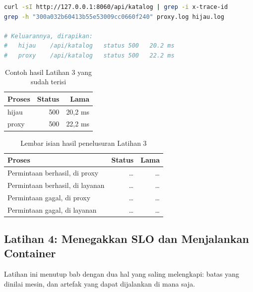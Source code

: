 \begin{lstlisting}[language=bash, caption={Mengambil trace id lalu mencarinya di kedua log, tersedia di \berkas{sources/chapter09/proxy.py}}, label={lst:c9-lat3-jalan}]
curl -sI http://127.0.0.1:8060/api/katalog | grep -i x-trace-id
grep -h "300a032b60413b55e53009cc0660f240" proxy.log hijau.log

# Keluarannya, dirapikan:
#   hijau    /api/katalog   status 500   20.2 ms
#   proxy    /api/katalog   status 500   22.2 ms
\end{lstlisting}

\begin{table}[!htb]
  \centering
  \caption{Contoh hasil Latihan 3 yang sudah terisi}
  \label{tab:c9-lat3-contoh}
  \begin{tabularx}{\textwidth}{lrr}
    \hline
    \textbf{Proses} & \textbf{Status} & \textbf{Lama} \\
    \hline
    hijau & 500 & 20,2 ms \\
    \hline
    proxy & 500 & 22,2 ms \\
    \hline
  \end{tabularx}
\end{table}

\begin{table}[!htb]
  \centering
  \caption{Lembar isian hasil penelusuran Latihan 3}
  \label{tab:c9-lat3-hasil}
  \begin{tabularx}{\textwidth}{lrr}
    \hline
    \textbf{Proses} & \textbf{Status} & \textbf{Lama} \\
    \hline
    Permintaan berhasil, di proxy & \dots & \dots \\
    \hline
    Permintaan berhasil, di layanan & \dots & \dots \\
    \hline
    Permintaan gagal, di proxy & \dots & \dots \\
    \hline
    Permintaan gagal, di layanan & \dots & \dots \\
    \hline
  \end{tabularx}
\end{table}

\subsection*{Latihan 4: Menegakkan SLO dan Menjalankan Container}

Latihan ini menutup bab dengan dua hal yang saling melengkapi: batas yang
dinilai mesin, dan artefak yang dapat dijalankan di mana saja.

